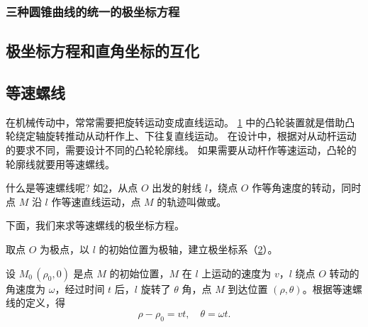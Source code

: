 \subsubsection{三种圆锥曲线的统一的极坐标方程}
\begin{Practice}
  \begin{question}
    \item 
    \item 
  \end{question}
\end{Practice}
\subsection{极坐标方程和直角坐标的互化}
\begin{Practice}
  \begin{question}
    \item 
    \item 
    \item 
    \item 
  \end{question}
\end{Practice}

\subsection{等速螺线}
在机械传动中，常常需要把旋转运动变成直线运动。
\cref{fig:4-20} 中的凸轮装置就是借助凸轮绕定轴旋转推动从动杆作上、下往复直线运动。
在设计中，根据对从动杆运动的要求不同，需要设计不同的凸轮轮廓线。
如果需要从动杆作等速运动，凸轮的轮廓线就要用等速螺线。
\begin{figure}
  \caption{}\label{fig:4-20}
\end{figure}

什么是等速螺线呢? 如\cref{fig:4-21}，从点 $O$ 出发的射线 $l$，绕点 $O$ 作等角速度的转动，同时点 $M$ 沿 $l$ 作等速直线运动，点 $M$ 的轨迹叫做或。
\begin{figure}
  \caption{}\label{fig:4-21}
\end{figure}

下面，我们来求等速螺线的极坐标方程。

取点 $O$ 为极点，以 $l$ 的初始位置为极轴，建立极坐标系（\cref{fig:4-21}）。

设 $M_0\,(\rho_0,0)$ 是点 $M$ 的初始位置，$M$ 在 $l$ 上运动的速度为 $v$，$l$ 绕点 $O$ 转动的角速度为 $\omega$，经过时间 $t$ 后，$l$ 旋转了 $\theta$ 角，点 $M$ 到达位置 $(\rho,\theta)$。根据等速螺线的定义，得
\[ \rho-\rho_0=vt,\quad \theta=\omega t.\]


